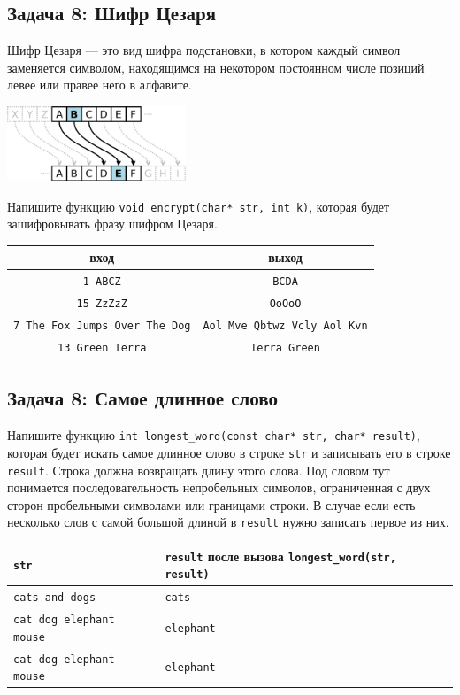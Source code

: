\documentclass{article}
\begin{document}
\subsection*{Задача 8: Шифр Цезаря}
Шифр Цезаря — это вид шифра подстановки, в котором каждый символ заменяется символом, находящимся на некотором постоянном числе позиций левее или правее него в алфавите. 
\begin{center}
\includegraphics[width=0.4\textwidth]{../images/caesar.png}
\end{center}
Напишите функцию \texttt{void encrypt(char* str, int k)}, которая будет зашифровывать фразу шифром Цезаря.
\begin{center}
\begin{tabular}{ c | c }
 вход & выход \\ \hline
 \texttt{1 ABCZ} & \texttt{BCDA}\\
 \texttt{15 ZzZzZ} & \texttt{OoOoO} \\
 \texttt{7 The Fox Jumps Over The Dog} & \texttt{Aol Mve Qbtwz Vcly Aol Kvn} \\
 \texttt{13  Green Terra} & \texttt{Terra Green}
\end{tabular}
\end{center}

\subsection*{Задача 8: Самое длинное слово}
Напишите функцию \texttt{int longest\_word(const char* str, char* result)}, которая будет искать самое длинное слово в строке \texttt{str} и записывать его в строке \texttt{result}. Строка должна возвращать длину этого слова. Под словом тут понимается последовательность непробельных символов, ограниченная с двух сторон пробельными символами или границами строки.
В случае если есть несколько слов с самой большой длиной в \texttt{result} нужно записать первое из них.

\begin{center}
\begin{tabular}{ l | l }
 \texttt{str} & \texttt{result} после вызова \texttt{longest\_word(str, result)} \\ \hline
 \texttt{cats and dogs} & \texttt{cats} \\
 \texttt{cat dog elephant mouse} & \texttt{elephant} \\
 \texttt{cat \quad dog \quad\quad elephant mouse} & \texttt{elephant} \\
\end{tabular}
\end{center}
\end{document}
